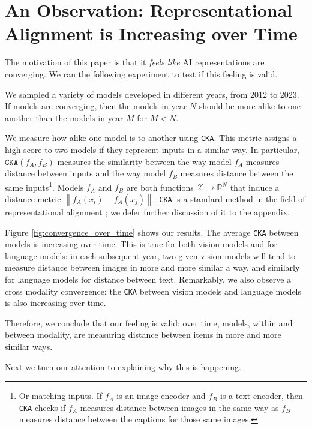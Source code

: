 \documentclass{article}
\theoremstyle{plain}
\theoremstyle{definition}
\theoremstyle{remark}
\newcommand{\norm}[1]{\left\lVert#1\right\rVert}
\begin{document}
\begin{abstract}
\lipsum[2]
\end{abstract}

\section{An Observation: Representational Alignment is Increasing over Time}

The motivation of this paper is that it \textit{feels like} AI representations are converging. We ran the following experiment to test if this feeling is valid.

We sampled a variety of models developed in different years, from 2012 to 2023. If models are converging, then the models in year $N$ should be more alike to one another than the models in year $M$ for $M<N$.

We measure how alike one model is to another using \texttt{CKA}. This metric assigns a high score to two models if they represent inputs in a similar way. In particular, $\texttt{CKA}(f_A,f_B)$ measures the similarity between the way model $f_A$ measures distance between inputs and the way model $f_B$ measures distance between the same inputs\footnote{Or matching inputs. If $f_A$ is an image encoder and $f_B$ is a text encoder, then \texttt{CKA} checks if $f_A$ measures distance between images in the same way as $f_B$ measures distance between the captions for those same images.}. Models $f_A$ and $f_B$ are both functions $\mathcal{X} \rightarrow \mathbb{R}^N$ that induce a distance metric $\norm{f_A(x_i) - f_A(x_j)}$. \texttt{CKA} is a standard method in the field of representational alignment \cite{XX}; we defer further discussion of it to the appendix.

Figure \ref{fig:convergence_over_time} shows our results. The average \texttt{CKA} between models is increasing over time. This is true for both vision models and for language models: in each subsequent year, two given vision models will tend to measure distance between images in more and more similar a way, and similarly for language models for distance between text. Remarkably, we also observe a cross modality convergence: the \texttt{CKA} between vision models and language models is also increasing over time.

Therefore, we conclude that our feeling is valid: over time, models, within and between modality, are measuring distance between items in more and more similar ways.

Next we turn our attention to explaining why this is happening.
\end{document}

